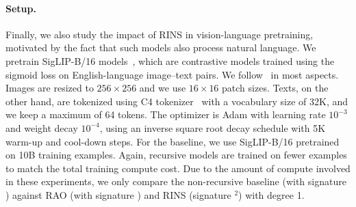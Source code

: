 \paragraph{Setup.}
Finally, we also study the impact of RINS in vision-language pretraining, motivated by the fact that such models also process natural language. We pretrain SigLIP-B/16 models~\cite{zhai2023sigmoidlosslanguageimage}, which are contrastive models trained using the sigmoid loss on English-language image–text pairs. We  follow~\cite{zhai2023sigmoidlosslanguageimage} in most aspects. Images are resized to $256\times256$ and we use $16\times16$ patch sizes.  Texts, on the other hand, are tokenized using C4 tokenizer~\cite{t5} with a vocabulary size of 32K, and we keep a maximum
of 64 tokens. The optimizer is Adam with learning rate $10^{-3}$ and weight decay $10^{-4}$, using an inverse square root decay schedule with 5K warm-up and cool-down steps. For the baseline, we use SigLIP-B/16 pretrained on 10B training examples. Again, recursive models are trained on fewer examples to match the total training compute cost. Due to the amount of compute involved in these experiments, we only compare the non-recursive baseline (with signature \A\B) against RAO (with signature \A\B\A\B) and RINS (signature \A$^2$\B) with degree 1.

